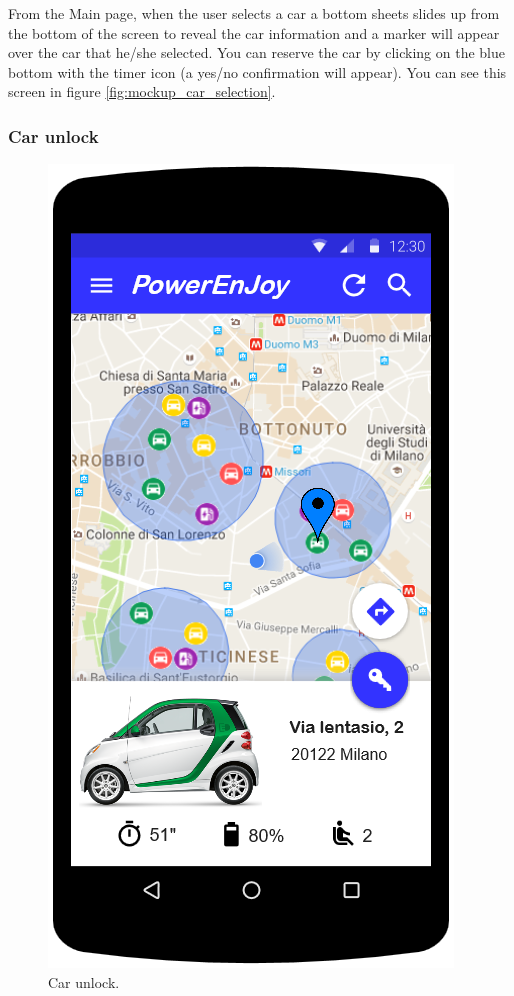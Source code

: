 From the Main page, when the user selects a car a bottom sheets slides up from the bottom of the screen to reveal the car information and a marker will appear over the car that he/she selected. You can reserve the car by clicking on the blue bottom with the timer icon (a yes/no confirmation will appear). You can see this screen in figure \ref{fig:mockup_car_selection}.

\subsubsection*{Car unlock}

\begin{figure}
	\centering
	\includegraphics[width=\textwidth,height=\dimexpr\textheight-4\baselineskip-\abovecaptionskip-\belowcaptionskip\relax,keepaspectratio]{overall_description/mockup/car_unlock.png}
	\caption{Car unlock.}
	\label{fig:mockup_car_unlock}
\end{figure}

